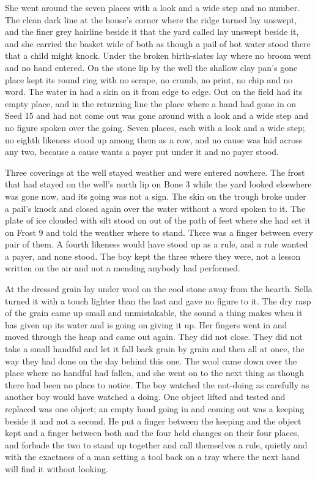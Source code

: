 She went around the seven places with a look and a wide step and no number. The clean dark line at the house's corner where the  ridge turned lay unswept, and the finer grey hairline beside it that the yard called  lay unswept beside it, and she carried the basket wide of both as though a pail of hot water stood there that a child might knock. Under  the broken birth-slates lay where no broom went and no hand entered. On the stone lip by the well the shallow clay pan's gone place kept its round ring with no scrape, no crumb, no print, no chip and no word. The water in  had a skin on it from edge to edge. Out on  the field had its empty place, and in the returning line the place where a hand had gone in on Seed 15 and had not come out was gone around with a look and a wide step and no figure spoken over the going. Seven places, each with a look and a wide step; no eighth likeness stood up among them as a row, and no cause was laid across any two, because a cause wants a payer put under it and no payer stood.

Three coverings at the well stayed weather and were entered nowhere. The frost that had stayed on the well's north lip on Bone 3 while the yard looked elsewhere was gone now, and its going was not a sign. The skin on the trough broke under a pail's knock and closed again over the water without a word spoken to it. The plate of ice clouded with silt stood on  out of the path of feet where she had set it on Frost 9 and told the weather where to stand. There was a finger between every pair of them. A fourth likeness would have stood up as a rule, and a rule wanted a payer, and none stood. The boy kept the three where they were, not a lesson written on the air and not a mending anybody had performed.

\scenebreak

At  the dressed grain lay under wool on the cool stone away from the hearth. Sella turned it with a touch lighter than the last and gave no figure to it. The dry rasp of the grain came up small and unmistakable, the sound a thing makes when it has given up its water and is going on giving it up. Her fingers went in and moved through the heap and came out again. They did not close. They did not take a small handful and let it fall back grain by grain and then all at once, the way they had done on the day behind this one. The wool came down over the place where no handful had fallen, and she went on to the next thing as though there had been no place to notice. The boy watched the not-doing as carefully as another boy would have watched a doing. One object lifted and tested and replaced was one object; an empty hand going in and coming out was a keeping beside it and not a second. He put a finger between the keeping and the object kept and a finger between both and the four held changes on their four places, and forbade the two to stand up together and call themselves a rule, quietly and with the exactness of a man setting a tool back on a tray where the next hand will find it without looking.

